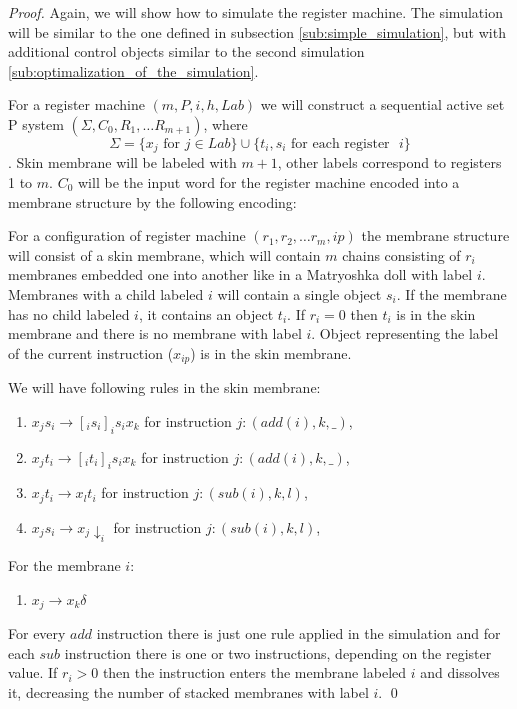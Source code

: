 \documentclass[submission,copyright,creativecommons]{../lib/lncs/llncs}
\begin{document}
\begin{proof}
  Again, we will show how to simulate the register machine. The simulation will be similar to the one defined in subsection \ref{sub:simple_simulation}, but with additional control objects similar to the second simulation \ref{sub:optimalization_of_the_simulation}.

  For a register machine $(m,P,i,h,Lab)$ we will construct a sequential active set P system $(\Sigma, C_0, R_1, \ldots R_{m+1})$, where $$\Sigma = \{x_j \text{~for~} j\in Lab\}\cup\{t_i, s_i \text{~for each register ~}i\}$$. Skin membrane will be labeled with $m+1$, other labels correspond to registers 1 to $m$. $C_0$ will be the input word for the register machine encoded into a membrane structure by the following encoding: 

  For a configuration of register machine $(r_1, r_2, \ldots r_m, ip)$ the membrane structure will consist of a skin membrane, which will contain $m$ chains consisting of $r_i$ membranes embedded one into another like in a Matryoshka doll with label $i$. Membranes with a child labeled $i$ will contain a single object $s_i$. If the membrane has no child labeled $i$, it contains an object $t_i$. If $r_i = 0$ then $t_i$ is in the skin membrane and there is no membrane with label $i$. Object representing the label of the current instruction ($x_{ip}$) is in the skin membrane.

  We will have following rules in the skin membrane:
  \begin{enumerate}
    \item\label{wrap_skin_add_s} $x_j s_i\rightarrow [_i s_i ]_i s_i x_k$ for instruction $j: (add(i), k, \_)$,
    \item\label{wrap_skin_add_t} $x_j t_i\rightarrow [_i t_i ]_i s_i x_k$ for instruction $j: (add(i), k, \_)$,
    \item\label{wrap_skin_sub_t} $x_j t_i\rightarrow x_l t_i$ for instruction $j: (sub(i), k, l)$,
    \item\label{wrap_skin_sub_s} $x_j s_i\rightarrow x_j\downarrow_i$ for instruction $j: (sub(i), k, l)$,
  \end{enumerate}

  For the membrane $i$:
  \begin{enumerate}[resume]
    \item\label{wrap_inner_dissolve} $x_j \rightarrow x_k\delta$
  \end{enumerate}

  For every $add$ instruction there is just one rule applied in the simulation and for each $sub$ instruction there is one or two instructions, depending on the register value. If $r_i>0$ then the instruction enters the membrane labeled $i$ and dissolves it, decreasing the number of stacked membranes with label $i$. \qed
\end{proof}
\end{document}
